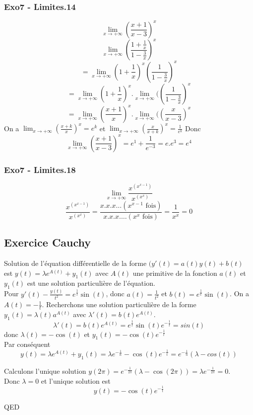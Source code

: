 \documentclass[]{book}
\theoremstyle{definition}
\begin{document}
\subsubsection*{Exo7 - Limites.14}
$$\lim_{x \to +\infty}\left(\frac{x+1}{x-3}\right)^x$$
$$\lim_{x \to +\infty}\left(\frac{1+\frac{1}{x}}{1-\frac{3}{x}}\right)^x$$
$$= \lim_{x \to +\infty}(1+\frac{1}{x})^x\left(\frac{1}{1-\frac{3}{x}}\right)^x$$
$$= \lim_{x \to +\infty}(1+\frac{1}{x})^x . \lim_{x \to +\infty}(\left(\frac{1}{1-\frac{3}{x}}\right)^x$$
$$= \lim_{x \to +\infty}\left(\frac{x+1}{x}\right)^x . \lim_{x \to +\infty}(\left(\frac{x}{x-3}\right)^x$$
On a $\lim_{x \to +\infty}\left(\frac{x+k}{x}\right)^x = {e^k}$ et $\lim_{x \to +\infty}\left(\frac{x}{x+k}\right)^x = \frac{1}{e^k}$ 
Donc
$$\lim_{x \to +\infty}\left(\frac{x+1}{x-3}\right)^x = e^1 + \frac{1}{e^{-3}} = e.e^3= e^4$$


\subsubsection*{Exo7 - Limites.18}
$$\lim_{x \to +\infty}\frac{x^{(x^{x-1})}}{x^{(x^{x})}}$$
$$\frac{x^{(x^{x-1})}}{x^{(x^{x})}} = \frac{x.x.x\ldots (x^{x-1} \textrm{ fois})}{x.x.x.\ldots (x^{x} \textrm{ fois})} =  \frac{1}{x^x} = 0$$


\newpage
\subsection*{Exercice Cauchy}
Solution de l'\'equation diff\'erentielle de la forme $(y'(t) = a(t)y(t) + b(t)$ est $y(t) = \lambda e^{A(t)}+y_1(t)$ avec $A(t)$ une primitive de la fonction $a(t)$ et $y_1(t)$ est une solution particuli\`ere de l'\'equation.\\

Pour $y'(t) - \frac{y(t)}{t^2} = e^{\frac{1}{t}}\sin(t)$, donc $a(t) = \frac{1}{t^2}$ et $b(t)= e^{\frac{1}{t}}\sin(t)$. On a $A(t) = -\frac{1}{t}$. Recherchons une  solution particuli\`ere de la forme $y_1(t) = \lambda(t)a^{A(t)}$ avec $\lambda'(t) = b(t)e^{A(t)}$.
$$\lambda'(t) = b(t)e^{A(t)} = e^{\frac{1}{t}}\sin(t)e^{-\frac{1}{t}} = sin(t)$$
donc $\lambda(t) =  -\cos(t)$ et $y_1(t) = -\cos(t)e^{-\frac{1}{t}}$\\
Par cons\'equent
$$y(t) = \lambda e^{A(t)}+y_1(t) = \lambda e^{-\frac{1}{n}} -\cos(t)e^{-\frac{1}{t}} = e^{-\frac{1}{n}}(\lambda-cos(t))$$

Calculons l'unique solution $y(2\pi) =  e^{-\frac{1}{2\pi}}(\lambda-\cos(2\pi)) = \lambda e^{-\frac{1}{2\pi}} = 0$.\\
Donc $\lambda = 0$ et l'unique solution est 
$$y(t) = -\cos(t)e^{-\frac{1}{t}}$$


QED
\end{document}
